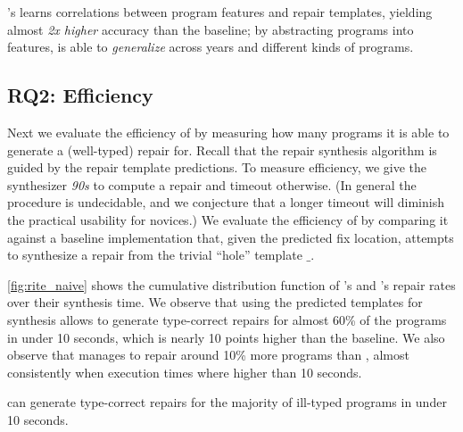 \begin{framed}
  \noindent \toolname's learns correlations between program features and repair
  templates, yielding almost \emph{2x higher} accuracy than the baseline; by
  abstracting programs into features, \toolname is able to \emph{generalize}
  across years and different kinds of programs.
\end{framed}


\subsection{RQ2: Efficiency}
\label{sec:eval:efficiency}
\label{subsec:eval:man_rep_qual_eval}

Next we evaluate the efficiency of \toolname by measuring how many programs it
is able to generate a (well-typed) repair for.
%
Recall that the repair synthesis algorithm is guided by the repair template
predictions.
%
To measure efficiency, we give the synthesizer \emph{90s} to compute a repair
and timeout otherwise. (In general the procedure is undecidable, and we
conjecture that a longer timeout will diminish the practical usability for
novices.)
%
We evaluate the efficiency of \toolname by comparing
it against a baseline \naive implementation that, given the predicted fix
location, attempts to synthesize a repair from the trivial ``hole'' template
$\_$.

\autoref{fig:rite_naive} shows the cumulative distribution function of
\toolname's and \naive's repair rates over their synthesis time. We observe that
using the predicted templates for synthesis allows \toolname to generate
type-correct repairs for almost 60\% of the programs in under 10 seconds, which
is nearly 10 points higher than the \naive baseline. We also observe that
\toolname manages to repair around 10\% more programs than \naive, almost
consistently when execution times where higher than 10 seconds.

\begin{framed}
  \noindent \toolname can generate type-correct repairs for the majority of
  ill-typed programs in under 10 seconds.
\end{framed}



